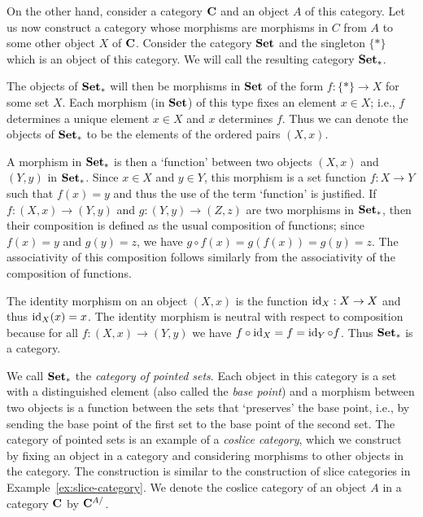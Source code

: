 \begin{example}
    \label{ex:coslice-category}
    On the other hand, consider a category \(\mathbf{C}\) and an object \(A\) of
    this category. Let us now construct a category whose morphisms are morphisms
    in \(C\) from \(A\) to some other object \(X\) of \(\mathbf{C}\). Consider the
    category \(\mathbf{Set}\) and the singleton \(\{*\}\) which is an object of this
    category. We will call the resulting category \(\mathbf{Set_*}\).

    The objects of \(\mathbf{Set_*}\) will then be morphisms in \(\mathbf{Set}\) of the
    form \(f: \{*\} \to X\) for some set \(X\). Each morphism (in \(\mathbf{Set}\)) of
    this type fixes an element \(x \in X\); i.e., \(f\) determines a unique
    element \(x \in X\) and \(x\) determines \(f\). Thus we can denote the
    objects of \(\mathbf{Set_*}\) to be the elements of the ordered pairs \((X,
    x)\).

    A morphism in \(\mathbf{Set_*}\) is then a `function' between two objects
    \((X, x)\) and \((Y, y)\) in \(\mathbf{Set_*}\). Since \(x \in X\) and \(y \in
    Y\), this morphism is a set function \(f : X \to Y\) such that \(f(x) = y\)
    and thus the use of the term `function' is justified. If \(f : (X, x) \to
    (Y, y)\) and \(g : (Y, y) \to (Z, z)\) are two morphisms in
    \(\mathbf{Set_*}\), then their composition is defined as the usual composition
    of functions; since \(f(x) = y\) and \(g(y) = z\), we have \(g \circ f(x) =
    g(f(x)) = g(y) = z\). The associativity of this composition follows
    similarly from the associativity of the composition of functions.

    The identity morphism on an object \((X, x)\) is the function \(\operatorname{id}_X : X
    \to X\) and thus \(\operatorname{id}_X(x) = x\). The identity morphism is neutral with
    respect to composition because for all \(f : (X, x) \to (Y, y)\) we have \(f
    \circ \operatorname{id}_X = f = \operatorname{id}_Y \circ f\). Thus \(\mathbf{Set_*}\) is a category.

    We call \(\mathbf{Set_*}\) the \emph{category of pointed sets}. Each object in
    this category is a set with a distinguished element (also called the
    \emph{base point}) and a morphism between two objects is a function between
    the sets that `preserves' the base point, i.e., by sending the base point of
    the first set to the base point of the second set. The category of pointed
    sets is an example of a \emph{coslice category}, which we construct by
    fixing an object in a category and considering morphisms to other objects in
    the category. The construction is similar to the construction of slice
    categories in Example~\ref{ex:slice-category}. We denote the coslice
    category of an object \(A\) in a category \(\mathbf{C}\) by \(\mathbf{C}^{A/}\).
\end{example}

